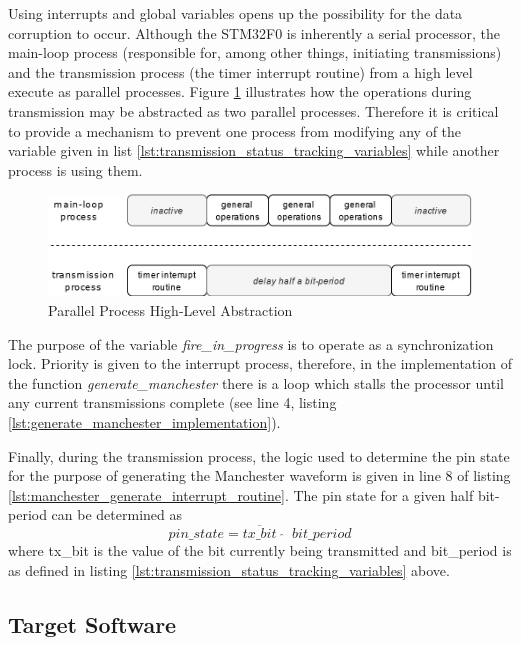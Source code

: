 Using interrupts and global variables opens up the possibility for the data corruption to occur. Although the STM32F0 is inherently a serial processor, the main-loop process (responsible for, among other things, initiating transmissions) and the transmission process (the timer interrupt routine) from a high level execute as parallel processes. Figure \ref{fig:parallel_process_abstraction} illustrates how the operations during transmission may be abstracted as two parallel processes. Therefore it is critical to provide a mechanism to prevent one process from modifying any of the variable given in list \ref{lst:transmission_status_tracking_variables} while another process is using them.

\begin{figure}[H]
	\centering
	\includegraphics[width=0.8\linewidth]{figures/design/parallel_process_transmission.png}
	\caption{Parallel Process High-Level Abstraction}
	\label{fig:parallel_process_abstraction}
\end{figure}

The purpose of the variable \textit{fire\_in\_progress} is to operate as a synchronization lock. Priority is given to the interrupt process, therefore, in the implementation of the function \textit{generate\_manchester} there is a loop which stalls the processor until any current transmissions complete (see line 4, listing \ref{lst:generate_manchester_implementation}).

Finally, during the transmission process, the logic used to determine the pin state for the purpose of generating the Manchester waveform is given in line 8 of listing \ref{lst:manchester_generate_interrupt_routine}. The pin state for a given half bit-period can be determined as \[pin\_state = \overline{tx\_bit} \;\; \widehat{} \;\; bit\_period\] where tx\_bit is the value of the bit currently being transmitted and bit\_period is as defined in listing \ref{lst:transmission_status_tracking_variables} above.








\subsection{Target Software}

